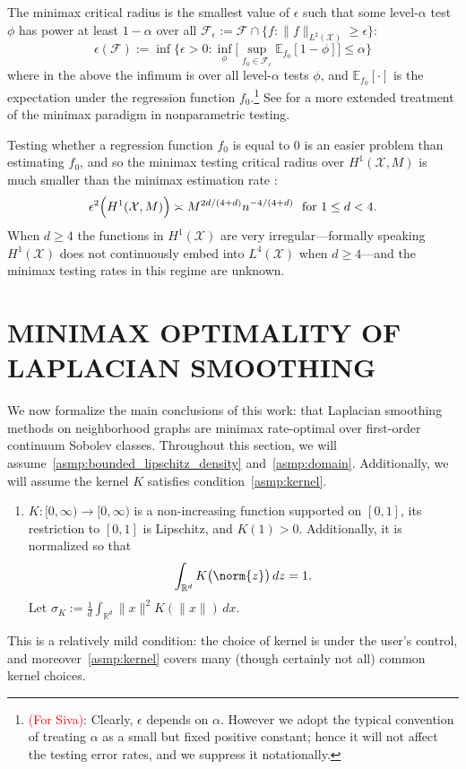 \documentclass[twoside]{article}
\newcommand{\Reals}{\mathbb{R}}
\newcommand{\1}{\mathbf{1}}
\newcommand{\Rd}{\Reals^d}
\newcommand{\Xset}{\mathcal{X}}
\newcommand{\Leb}{L}
\newcommand{\mc}[1]{\mathcal{#1}}
\newcommand{\Ebb}{\mathbb{E}}
\theoremstyle{definition}
\theoremstyle{remark}
\begin{document}
The minimax critical radius is the smallest value of $\epsilon$ such that some level-${\alpha}$ test $\phi$ has power at least $1 - \alpha$ over all $\mc{F}_{\epsilon} := \mc{F} \cap \{f: \|f\|_{\Leb^2(\Xset)} \geq \epsilon\}$:
\begin{equation*}
\epsilon(\mc{F}) := \inf\Biggl\{\epsilon > 0: \inf_{\phi} \biggl[ \sup_{f_0 \in \mc{F}_{\epsilon}} \Ebb_{f_0}[1 - \phi]\biggr] \leq \alpha\Biggr\}
\end{equation*} 
where in the above the infimum is over all level-$\alpha$ tests $\phi$, and $\Ebb_{f_0}[\cdot]$ is the expectation under the regression function $f_0$.\footnote{\textcolor{red}{(For Siva)}: Clearly, $\epsilon$ depends on $\alpha$. However we adopt the typical convention of treating $\alpha$ as a small but fixed positive constant; hence it will not affect the testing error rates, and we suppress it notationally.} See \citep{ingster82, ingster87, ingster2012, ariascastro2018} for a more extended treatment of the minimax paradigm in nonparametric testing. 

Testing whether a regression function $f_0$ is equal to $0$ is an easier problem than estimating $f_0$, and so the minimax testing critical radius over $H^1(\Xset,M)$ is much smaller than the minimax estimation rate \citep{ingster2009}:
\begin{equation}
\label{eqn:sobolev_space_testing_critical_radius}
\epsilon^2\Bigl(H^1(\Xset,M)\Bigr) \asymp M^{2d/(4 + d)}n^{-4/(4 + d)}~~\textrm{for $1 \leq d < 4$.}
\end{equation}
When $d \geq 4$ the functions in $H^1(\Xset)$ are very irregular---formally speaking $H^1(\Xset)$ does not continuously embed into $\Leb^4(\Xset)$ when $d \geq 4$---and the minimax testing rates in this regime are unknown. 

\section{MINIMAX OPTIMALITY OF LAPLACIAN SMOOTHING}
\label{sec:minimax_optimal_laplacian_smoothing}

We now formalize the main conclusions of this work: that Laplacian smoothing methods on neighborhood graphs are minimax rate-optimal over first-order continuum Sobolev classes. Throughout this section, we will assume~\ref{asmp:bounded_lipschitz_density} and~\ref{asmp:domain}. Additionally, we will assume the kernel $K$ satisfies condition~\ref{asmp:kernel}.
\begin{enumerate}[label=(K\arabic*)]
	\item
	\label{asmp:kernel}
	$K:[0,\infty) \to [0,\infty)$ is a non-increasing function supported on $[0,1]$, its restriction to $[0,1]$ is Lipschitz, and $K(1) > 0$. Additionally, it is normalized so that
	\begin{equation*}
	\int_{\Reals^d} K\bigl(\norm{z}\bigr) \,dz = 1.
	\end{equation*}
	Let $\sigma_K := \frac{1}{d} \int_{\Rd} \|x\|^2 K(\|x\|) \,dx$.
\end{enumerate}
This is a relatively mild condition: the choice of kernel is under the user's control, and moreover~\ref{asmp:kernel} covers many (though certainly not all) common kernel choices.
\end{document}
